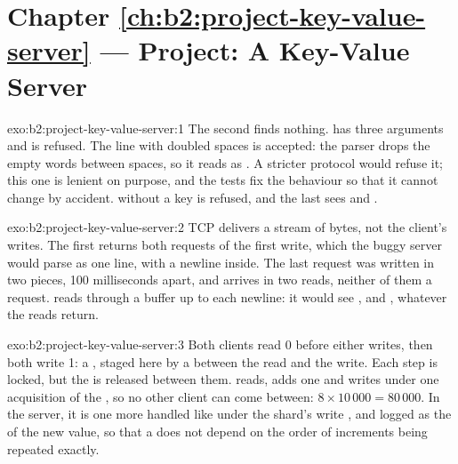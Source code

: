 \section*{Chapter \ref{ch:b2:project-key-value-server} --- Project: A Key-Value Server}

\begin{solution}{exo:b2:project-key-value-server:1}
The second  finds nothing.  has three arguments and is refused. The line with doubled spaces
is accepted: the parser drops the empty words between spaces, so it reads as . A stricter protocol would
refuse it; this one is lenient on purpose, and the tests fix the behaviour so that it cannot change by accident.
 without a key is refused, and the last  sees  and .
\end{solution}

\begin{solution}{exo:b2:project-key-value-server:2}
TCP delivers a stream of bytes, not the client's writes. The first  returns both requests of the first write,
which the buggy server would parse as one line, with a newline inside. The last request was written in two pieces, 100
milliseconds apart, and arrives in two reads, neither of them a request. 
reads through a buffer up to each newline: it would see ,  and , whatever the
reads return.
\end{solution}

\begin{solution}{exo:b2:project-key-value-server:3}
Both clients read 0 before either writes, then both write 1: a , staged here by a  between the read
and the write. Each step is locked, but the  is released between them.  reads, adds one and writes under
one acquisition of the , so no other client can come between: $8 \times 10\,000 = 80\,000$. In the server, it is one
more  handled like  under the shard's write , and logged as the  of the new value,
so that a  does not depend on the order of increments being repeated exactly.
\end{solution}

